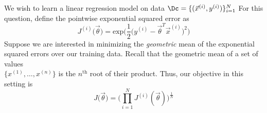 \begin{questions}
\question We wish to learn a linear regression model on data $\Dc = \{ (\vec{x}^{(i)}, y^{(i)}) \}_{i=1}^N$ For this question, define the pointwise exponential squared error as
\[
    J^{(i)}\Big(\vec{\theta}\Big)=\textrm{exp}\bigg(\frac{1}{2}\Big(y^{(i)} - \vec{\theta}^T\vec{x}^{(i)}\Big)^2\bigg)
\]
Suppose we are interested in minimizing the \emph{geometric} mean of the exponential squared errors over our training data. Recall that the geometric mean of a set of values \\ $\{x^{(1)}, \ldots, x^{(n)}\}$ is the $n^{\textrm{th}}$ root of their product. Thus, our objective in this setting is
\[
    J\Big(\vec{\theta}\Big)=\bigg(\prod_{i=1}^N J^{(i)}(\vec{\theta})\bigg)^{\frac{1}{N}}
\]

\end{questions}
